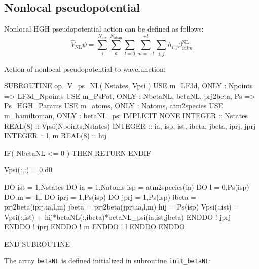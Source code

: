 \subsection{Nonlocal pseudopotential}

Nonlocal HGH pseudopotential action can be defined as follows:
\begin{equation}
\hat{V}_{\mathrm{NL}} \psi =
\sum_{i}^{N_{\mathrm{occ}}} \sum_{a}^{N_{\mathrm{atom}}}
\sum_{l=0}\sum_{m=-l}^{+l} \sum_{i,j}
h_{i,j} \beta^{\mathrm{NL}}_{ialm}
\end{equation}

Action of nonlocal pseudopotential to wavefunction:

\begin{fortrancode}
SUBROUTINE op_V_ps_NL( Nstates, Vpsi )
  USE m_LF3d, ONLY : Npoints => LF3d_Npoints
  USE m_PsPot, ONLY : NbetaNL, betaNL, prj2beta, Ps => Ps_HGH_Params
  USE m_atoms, ONLY : Natoms, atm2species
  USE m_hamiltonian, ONLY : betaNL_psi
  IMPLICIT NONE
  INTEGER :: Nstates
  REAL(8) :: Vpsi(Npoints,Nstates)
  INTEGER :: ia, isp, ist, ibeta, jbeta, iprj, jprj
  INTEGER :: l, m
  REAL(8) :: hij

  IF( NbetaNL <= 0 ) THEN
    RETURN
  ENDIF

  Vpsi(:,:) = 0.d0

  DO ist = 1,Nstates
    DO ia = 1,Natoms
      isp = atm2species(ia)
      DO l = 0,Ps(isp)%
      DO m = -l,l
        DO iprj = 1,Ps(isp)%
        DO jprj = 1,Ps(isp)%
          ibeta = prj2beta(iprj,ia,l,m)
          jbeta = prj2beta(jprj,ia,l,m)
          hij = Ps(isp)%
          Vpsi(:,ist) = Vpsi(:,ist) + hij*betaNL(:,ibeta)*betaNL_psi(ia,ist,jbeta)
        ENDDO ! jprj
        ENDDO ! iprj
      ENDDO ! m
      ENDDO ! l
    ENDDO
  ENDDO

END SUBROUTINE
\end{fortrancode}

The array {\tt betaNL} is defined initialized in subroutine {\tt init\_betaNL}:

